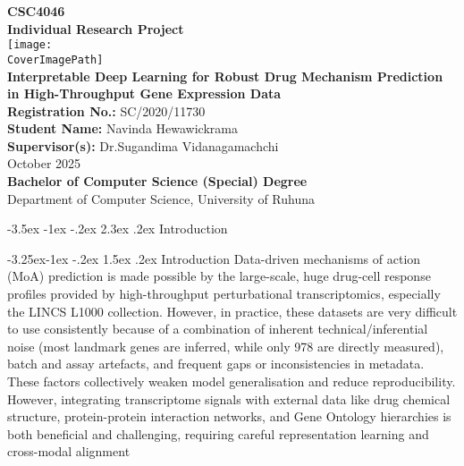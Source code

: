 \documentclass[12pt,a4paper]{article}
\makeatletter
\renewcommand\section{\@startsection{section}{1}{\z@}%
  {-3.5ex \@plus-1ex \@minus-.2ex}%
  {2.3ex \@plus.2ex}%
  {\normalfont\large\bfseries}}
\renewcommand\subsection{\@startsection{subsection}{2}{\z@}%
  {-3.25ex\@plus-1ex \@minus-.2ex}%
  {1.5ex \@plus.2ex}%
  {\normalfont\normalsize\bfseries}}
\newcommand{\CourseCodeNumber}{CSC4046 }
\newcommand{\CourseCodeName}{Individual Research Project}
\newcommand{\ProjectTitle}{Interpretable Deep Learning for Robust Drug Mechanism Prediction in High-Throughput Gene Expression Data}
\newcommand{\StudentName}{Navinda Hewawickrama}
\newcommand{\RegistrationNumber}{SC/2020/11730} %
\newcommand{\Supervisors}{Dr.Sugandima Vidanagamachchi} %
\newcommand{\SubmissionDate}{October 2025}
\newcommand{\CoverImagePath}{RUHUNAPNG} %
\makeatother
\begin{document}
\begin{titlepage}
  \thispagestyle{empty} 
  \begin{center}
    \vspace*{10mm}
    {\Large \textbf{\CourseCodeNumber}}\\[6mm]
    {\Large \textbf{\CourseCodeName}}\\[6mm]
    \texttt{[image: \\CoverImagePath]}\\[10mm]
    
    {\Large \textbf{\ProjectTitle}}\\[10mm]

    

    \textbf{Registration No.:} \RegistrationNumber\\[2mm]
    \textbf{Student Name:} \StudentName\\[6mm]
    \textbf{Supervisor(s):} \Supervisors\\[10mm]

    \SubmissionDate\\[12mm]

    \vfill
    \textbf{Bachelor of Computer Science (Special) Degree}\\
    Department of Computer Science, University of Ruhuna
  \end{center}
\end{titlepage}

\clearpage
{}


\section{Introduction}

\subsection{Introduction}
Data-driven mechanisms of action (MoA) prediction is made possible by the large-scale, huge drug-cell response profiles provided by high-throughput perturbational transcriptomics, especially the LINCS L1000 collection. However, in practice, these datasets are very difficult to use consistently because of a combination of inherent technical/inferential noise (most landmark genes are inferred, while only 978 are directly measured), batch and assay artefacts, and frequent gaps or inconsistencies in metadata. These factors collectively weaken model generalisation and reduce reproducibility. However, integrating transcriptome signals with external data like drug chemical structure, protein-protein interaction networks, and Gene Ontology hierarchies is both beneficial and challenging, requiring careful representation learning and cross-modal alignment\cite{subramanian2017next,stathias2018sustainable,mcdermott2019deep,wu2022deep}
\end{document}
